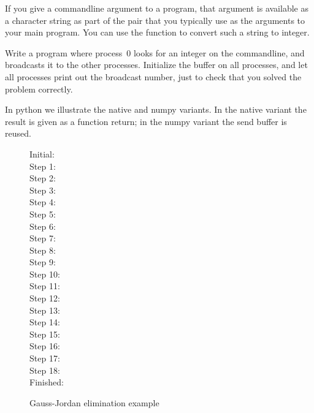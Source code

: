 

\begin{exercise}
  \label{ex:argv-bcast}
  If you give a commandline argument to a program, that argument is available
  as a character string as part of the  pair that you typically use
  as the arguments to your main program. You can use the function  to
  convert such a string to integer.

  Write a program where process~0 looks for an integer on the commandline, and
  broadcasts it to the other processes. Initialize the buffer on all processes, and
  let all processes print out the broadcast number,
  just to check that you solved the problem correctly.
\end{exercise}

In python we illustrate the native and numpy variants. In the native
variant the result is given as a function return; in the numpy variant
the send buffer is reused.
%

\begin{figure}[p]
  \tiny
  \begin{multicols}{3}
    Initial:\\ \nobreak
    Step 1:\\ \nobreak
    Step 2:\\ \nobreak
    Step 3:\\ \nobreak
    Step 4:\\ \nobreak
    Step 5:\\ \nobreak
    Step 6:\\ \nobreak
    Step 7:\\ \nobreak
    Step 8:\\ \nobreak
    Step 9:\\ \nobreak
    Step 10:\\ \nobreak
    Step 11:\\ \nobreak
    Step 12:\\ \nobreak
    Step 13:\\ \nobreak
    Step 14:\\ \nobreak
    Step 15:\\ \nobreak
    Step 16:\\ \nobreak
    Step 17:\\ \nobreak
    Step 18:\\ \nobreak
    Finished:\\ \nobreak
  \end{multicols}
  \caption{Gauss-Jordan elimination example}
  \label{fig:gauss-jordan-ex}
\end{figure}

